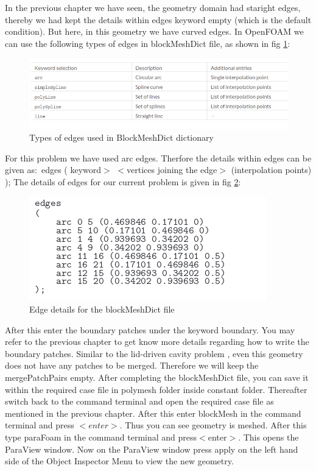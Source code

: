 \documentclass[a4paper,12pt]{report}
\begin{document}
\flushleft In the previous chapter we have seen, the geometry domain had staright edges, thereby we had kept the details within edges keyword  empty (which is the default condition). But here, in this geometry we have curved edges. In OpenFOAM we can use the following types of edges in blockMeshDict file, as shown in fig \ref{ref}{$:$}

\begin{figure}[ht]  
\begin{center}  
\includegraphics[scale=0.6]{ref.png}
\caption{Types of edges used in BlockMeshDict dictionary}
\label{ref}
\end{center}  
\end{figure}

\flushleft For this problem we have used arc edges. Therfore the details within edges can be given as{$:$}
\flushleft edges
\flushleft (
 \flushleft{$<$}keyword{$>$} {$<$}vertices joining the edge{$>$} (interpolation points)
\flushleft);
\flushleft The details of edges for our current problem is given in fig \ref{edges}{$:$}

\begin{figure}[ht]  
\begin{center}  
\includegraphics[scale=0.7]{edges.png}
\caption{Edge details for the blockMeshDict file}
\label{edges}
\end{center}  
\end{figure}

\flushleft After this enter the boundary patches under the keyword boundary. You may refer to the previous chapter to get know more details regarding how to write the boundary patches.
\flushleft Similar to the lid-driven cavity problem , even this geometry does not have any patches to be merged. Therefore we will keep the mergePatchPairs empty.
\flushleft After completing the blockMeshDict file, you can save it within the required case file in polymesh folder inside constant folder. Thereafter switch back to the command terminal and open the required case file as mentioned in the previous chapter.
\flushleft After this enter blockMesh in the command terminal and press $<enter>$. Thus you can see geometry is meshed. After this type paraFoam in the command terminal and press{$<$}enter{$>$}. This opens the ParaView window. Now on the ParaView window press apply on the left hand side of the Object Inspector Menu to view the new geometry.
\end{document}
